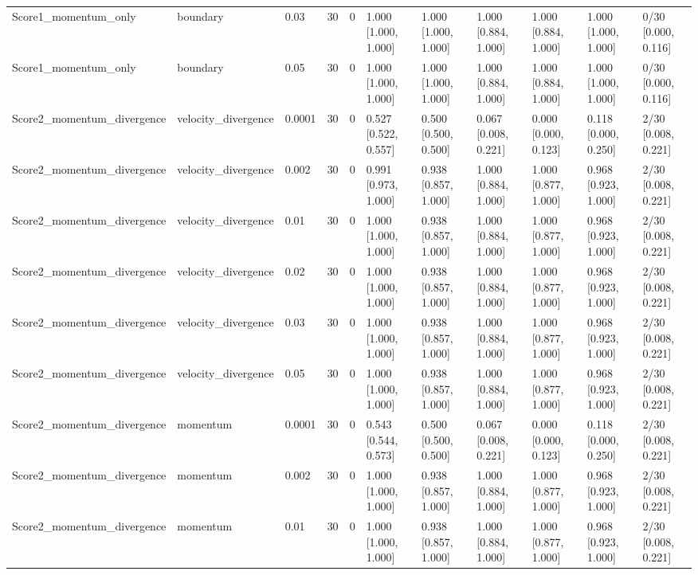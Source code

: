 \begin{longtable}{lllllllllll}
Score1\_momentum\_only & boundary & 0.03 & 30 & 0 & 1.000 [1.000, 1.000] & 1.000 [1.000, 1.000] & 1.000 [0.884, 1.000] & 1.000 [0.884, 1.000] & 1.000 [1.000, 1.000] & 0/30 [0.000, 0.116] \\
Score1\_momentum\_only & boundary & 0.05 & 30 & 0 & 1.000 [1.000, 1.000] & 1.000 [1.000, 1.000] & 1.000 [0.884, 1.000] & 1.000 [0.884, 1.000] & 1.000 [1.000, 1.000] & 0/30 [0.000, 0.116] \\
Score2\_momentum\_divergence & velocity\_divergence & 0.0001 & 30 & 0 & 0.527 [0.522, 0.557] & 0.500 [0.500, 0.500] & 0.067 [0.008, 0.221] & 0.000 [0.000, 0.123] & 0.118 [0.000, 0.250] & 2/30 [0.008, 0.221] \\
Score2\_momentum\_divergence & velocity\_divergence & 0.002 & 30 & 0 & 0.991 [0.973, 1.000] & 0.938 [0.857, 1.000] & 1.000 [0.884, 1.000] & 1.000 [0.877, 1.000] & 0.968 [0.923, 1.000] & 2/30 [0.008, 0.221] \\
Score2\_momentum\_divergence & velocity\_divergence & 0.01 & 30 & 0 & 1.000 [1.000, 1.000] & 0.938 [0.857, 1.000] & 1.000 [0.884, 1.000] & 1.000 [0.877, 1.000] & 0.968 [0.923, 1.000] & 2/30 [0.008, 0.221] \\
Score2\_momentum\_divergence & velocity\_divergence & 0.02 & 30 & 0 & 1.000 [1.000, 1.000] & 0.938 [0.857, 1.000] & 1.000 [0.884, 1.000] & 1.000 [0.877, 1.000] & 0.968 [0.923, 1.000] & 2/30 [0.008, 0.221] \\
Score2\_momentum\_divergence & velocity\_divergence & 0.03 & 30 & 0 & 1.000 [1.000, 1.000] & 0.938 [0.857, 1.000] & 1.000 [0.884, 1.000] & 1.000 [0.877, 1.000] & 0.968 [0.923, 1.000] & 2/30 [0.008, 0.221] \\
Score2\_momentum\_divergence & velocity\_divergence & 0.05 & 30 & 0 & 1.000 [1.000, 1.000] & 0.938 [0.857, 1.000] & 1.000 [0.884, 1.000] & 1.000 [0.877, 1.000] & 0.968 [0.923, 1.000] & 2/30 [0.008, 0.221] \\
Score2\_momentum\_divergence & momentum & 0.0001 & 30 & 0 & 0.543 [0.544, 0.573] & 0.500 [0.500, 0.500] & 0.067 [0.008, 0.221] & 0.000 [0.000, 0.123] & 0.118 [0.000, 0.250] & 2/30 [0.008, 0.221] \\
Score2\_momentum\_divergence & momentum & 0.002 & 30 & 0 & 1.000 [1.000, 1.000] & 0.938 [0.857, 1.000] & 1.000 [0.884, 1.000] & 1.000 [0.877, 1.000] & 0.968 [0.923, 1.000] & 2/30 [0.008, 0.221] \\
Score2\_momentum\_divergence & momentum & 0.01 & 30 & 0 & 1.000 [1.000, 1.000] & 0.938 [0.857, 1.000] & 1.000 [0.884, 1.000] & 1.000 [0.877, 1.000] & 0.968 [0.923, 1.000] & 2/30 [0.008, 0.221] \\

\end{longtable}
